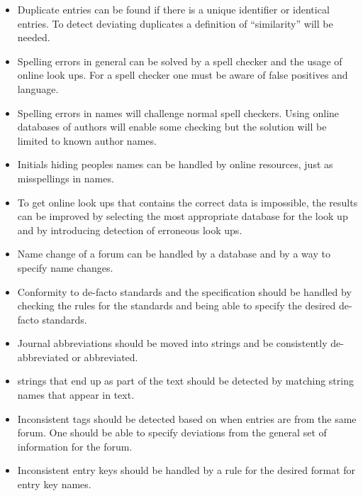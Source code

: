 \begin{itemize}
\item Duplicate entries can be found if there is a unique identifier
  or identical entries.  To detect deviating duplicates a definition
  of ``similarity'' will be needed.

\item Spelling errors in general can be solved by a spell checker and
  the usage of online look ups.  For a spell checker one must be aware
  of false positives and language.

\item Spelling errors in names will challenge normal spell checkers.
  Using online databases of authors will enable some checking but the
  solution will be limited to known author names.

\item Initials hiding peoples names can be handled by online
  resources, just as misspellings in names.

\item To get online look ups that contains the correct data is
  impossible, the results can be improved by selecting the most
  appropriate database for the look up and by introducing detection of
  erroneous look ups.

\item Name change of a forum can be handled by a database and by a way
  to specify name changes.

\item Conformity to de-facto standards and the {\bibtex} specification
  should be handled by checking the rules for the standards and being
  able to specify the desired de-facto standards.

\item Journal abbreviations should be moved into strings and be
  consistently de-abbreviated or abbreviated.

\item {\bibtex} strings that end up as part of the text should be
  detected by matching string names that appear in text.

\item Inconsistent tags should be detected based on when entries are
  from the same forum.  One should be able to specify deviations from
  the general set of information for the forum.

\item Inconsistent entry keys should be handled by a rule for the
  desired format for entry key names.
\end{itemize}

